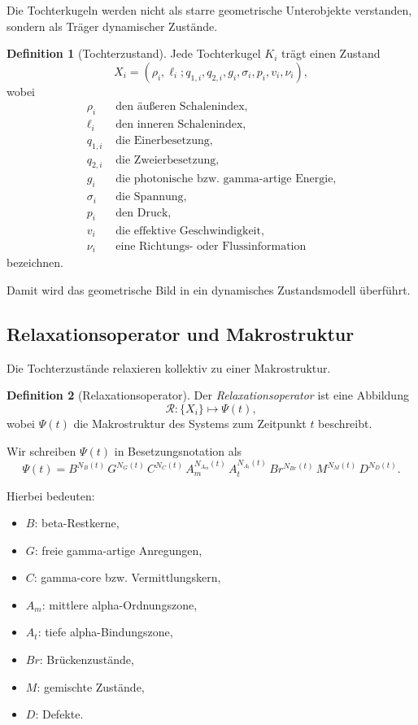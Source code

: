 \documentclass[11pt,a4paper]{article}
\theoremstyle{definition}
\newtheorem{definition}{Definition}[section]
\theoremstyle{plain}
\theoremstyle{remark}
\begin{document}
	Die Tochterkugeln werden nicht als starre geometrische Unterobjekte verstanden, sondern als Träger dynamischer Zustände.
	
	\begin{definition}[Tochterzustand]
		Jede Tochterkugel \(K_i\) trägt einen Zustand
		\[
		X_i=(\rho_i,\ell_i;q_{1,i},q_{2,i},g_i,\sigma_i,p_i,v_i,\nu_i),
		\]
		wobei
		\begin{align*}
			\rho_i &\text{ den äußeren Schalenindex},\\
			\ell_i &\text{ den inneren Schalenindex},\\
			q_{1,i} &\text{ die Einerbesetzung},\\
			q_{2,i} &\text{ die Zweierbesetzung},\\
			g_i &\text{ die photonische bzw. gamma-artige Energie},\\
			\sigma_i &\text{ die Spannung},\\
			p_i &\text{ den Druck},\\
			v_i &\text{ die effektive Geschwindigkeit},\\
			\nu_i &\text{ eine Richtungs- oder Flussinformation}
		\end{align*}
		bezeichnen.
	\end{definition}
	
	Damit wird das geometrische Bild in ein dynamisches Zustandsmodell überführt.
	
	\subsection{Relaxationsoperator und Makrostruktur}
	
	Die Tochterzustände relaxieren kollektiv zu einer Makrostruktur.
	
	\begin{definition}[Relaxationsoperator]
		Der \emph{Relaxationsoperator} ist eine Abbildung
		\[
		\mathcal{R}:\{X_i\}\longmapsto \Psi(t),
		\]
		wobei \(\Psi(t)\) die Makrostruktur des Systems zum Zeitpunkt \(t\) beschreibt.
	\end{definition}
	
	Wir schreiben \(\Psi(t)\) in Besetzungsnotation als
	\[
	\Psi(t)=B^{N_B(t)}\,G^{N_G(t)}\,C^{N_C(t)}\,A_m^{N_{A_m}(t)}\,A_t^{N_{A_t}(t)}\,Br^{N_{Br}(t)}\,M^{N_M(t)}\,D^{N_D(t)}.
	\]
	
	Hierbei bedeuten:
	\begin{itemize}
		\item \(B\): beta-Restkerne,
		\item \(G\): freie gamma-artige Anregungen,
		\item \(C\): gamma-core bzw. Vermittlungskern,
		\item \(A_m\): mittlere alpha-Ordnungszone,
		\item \(A_t\): tiefe alpha-Bindungszone,
		\item \(Br\): Brückenzustände,
		\item \(M\): gemischte Zustände,
		\item \(D\): Defekte.
	\end{itemize}
	
\end{document}
